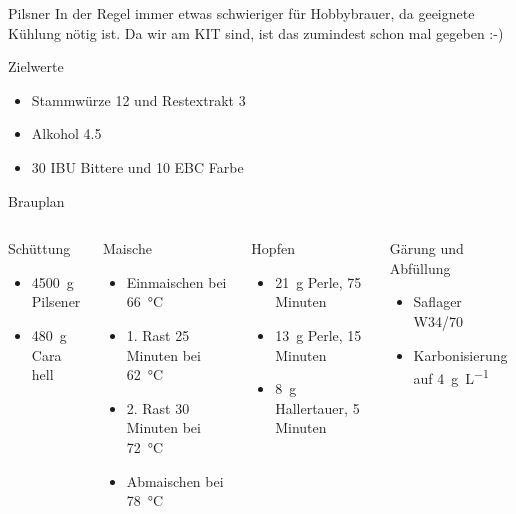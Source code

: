 \documentclass[9pt, ngerman]{beamer}
\begin{document}
\begin{frame}{Pilsner}
  In der Regel immer etwas schwieriger für Hobbybrauer, da geeignete Kühlung
  nötig ist. Da wir am KIT sind, ist das zumindest schon mal gegeben :-)

  \vspace{1em}
  \begin{block}{Zielwerte}
    \begin{itemize}
      \item Stammwürze \SI{12}{\dP} und Restextrakt \SI{3}{\dP}
      \item Alkohol \SI{4.5}{\volP}
      \item 30 IBU Bittere und 10 EBC Farbe
    \end{itemize}
  \end{block}
\end{frame}
\begin{frame}{Brauplan}
  \begin{columns}[T, onlytextwidth]
      \begin{block}{Schüttung}
        \begin{itemize}
          \item \SI{4500}{\gram} Pilsener
          \item \SI{480}{\gram} Cara hell
        \end{itemize}
      \end{block}
      \begin{block}{Maische}
        \begin{itemize}
          \item Einmaischen bei \SI{66}{\celsius}
          \item 1. Rast 25 Minuten bei \SI{62}{\celsius}
          \item 2. Rast 30 Minuten bei \SI{72}{\celsius}
          \item Abmaischen bei \SI{78}{\celsius}
        \end{itemize}
      \end{block}

      \begin{block}{Hopfen}
        \begin{itemize}
          \item \SI{21}{\gram} Perle, 75 Minuten
          \item \SI{13}{\gram} Perle, 15 Minuten
          \item \SI{8}{\gram} Hallertauer, 5 Minuten
        \end{itemize}
      \end{block}
      \begin{block}{Gärung und Abfüllung}
        \begin{itemize}
          \item Saflager W34/70
          \item Karbonisierung auf \SI{4}{\gram\per\liter} 
        \end{itemize}
      \end{block}

  \end{columns}
\end{frame}
\end{document}
